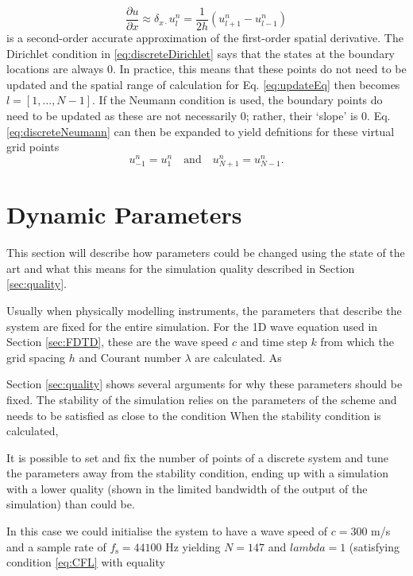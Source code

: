 \documentclass[dvipsnames, preprint]{JASA}
\begin{document}
\begin{equation}
    \frac{\partial u}{\partial x} \approx \delta_{x\cdot}u_l^n = \frac{1}{2h}\left(u_{l+1}^n - u_{l-1}^n\right)
\end{equation}
is a second-order accurate approximation of the first-order spatial derivative. The Dirichlet condition in \eqref{eq:discreteDirichlet} says that the states at the boundary locations are always 0. In practice, this means that these points do not need to be updated and the spatial range of calculation for Eq. \eqref{eq:updateEq} then becomes $l = [1, \hdots, N-1]$. If the Neumann condition is used, the boundary points do need to be updated as these are not necessarily $0$; rather, their `slope' is $0$. Eq. \eqref{eq:discreteNeumann} can then be expanded to yield defnitions for these virtual grid points
\begin{equation}
    u_{-1}^n = u_1^n \quad \text{and} \quad u_{N+1}^n = u_{N-1}^n.
\end{equation}


\section{Dynamic Parameters}
This section will describe how parameters could be changed using the state of the art and what this means for the simulation quality described in Section \ref{sec:quality}.

Usually when physically modelling instruments, the parameters that describe the system are fixed for the entire simulation. For the 1D wave equation used in Section \ref{sec:FDTD}, these are the wave speed $c$ and time step $k$ from which the grid spacing $h$ and Courant number $\lambda$ are calculated. As 


Section \ref{sec:quality} shows several arguments for why these parameters should be fixed. The stability of the simulation relies on the parameters of the scheme and needs to be satisfied as close to the condition  When the stability condition is calculated,


It is possible to set and fix the number of points of a discrete system and tune the parameters away from the stability condition, ending up with a simulation with a lower quality (shown in the limited bandwidth of the output of the simulation) than could be.

In this case we could initialise the system to have a wave speed of $c = 300$ m/s and a sample rate of $f_\text{s} = 44100$ Hz yielding $N = 147$ and $lambda = 1$ (satisfying condition \eqref{eq:CFL} with equality
\end{document}
